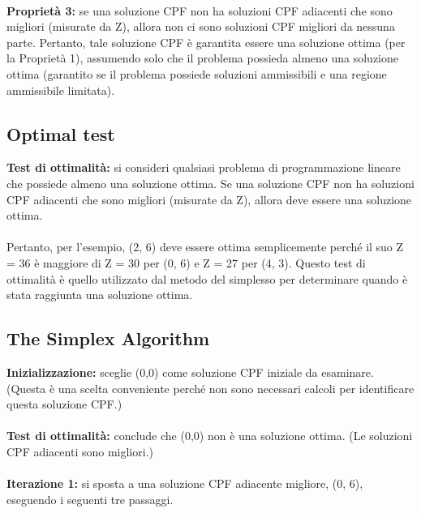 \documentclass[a4paper, 11pt]{article}
\begin{document}
        \paragraph{}
        \textbf{Proprietà 3:} se una soluzione CPF non ha soluzioni CPF adiacenti che sono migliori (misurate da Z), allora non ci sono soluzioni CPF migliori da nessuna parte. Pertanto, tale soluzione CPF è garantita essere una soluzione ottima (per la Proprietà 1), assumendo solo che il problema possieda almeno una soluzione ottima (garantito se il problema possiede soluzioni ammissibili e una regione ammissibile limitata).

        \subsection{Optimal test}

        \textbf{Test di ottimalità: } si consideri qualsiasi problema di programmazione lineare che possiede almeno una soluzione ottima. Se una soluzione CPF non ha soluzioni CPF adiacenti che sono migliori (misurate da Z), allora deve essere una soluzione ottima.

        \paragraph{}
        Pertanto, per l'esempio, (2, 6) deve essere ottima semplicemente perché il suo Z = 36 è maggiore di Z = 30 per (0, 6) e Z = 27 per (4, 3). Questo test di ottimalità è quello utilizzato dal metodo del simplesso per determinare quando è stata raggiunta una soluzione ottima.

        \subsection{The Simplex Algorithm}

        \textbf{Inizializzazione: } sceglie (0,0) come soluzione CPF iniziale da esaminare. (Questa è una scelta conveniente perché non sono necessari calcoli per identificare questa soluzione CPF.)

        \paragraph{}
        \textbf{Test di ottimalità:} conclude che (0,0) non è una soluzione ottima. (Le soluzioni CPF adiacenti sono migliori.)

        \paragraph{}
        \textbf{Iterazione 1:} si sposta a una soluzione CPF adiacente migliore, (0, 6), eseguendo i seguenti tre passaggi.
\end{document}
